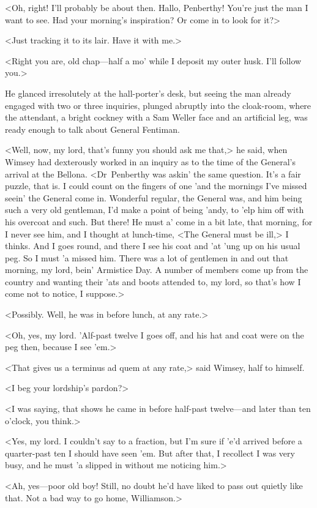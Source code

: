 <Oh, right! I'll probably be about then. Hallo, Penberthy! You're just the man I want to see. Had your morning's inspiration? Or come in to look for it?>

<Just tracking it to its lair. Have it with me.>

<Right you are, old chap—half a mo' while I deposit my outer husk. I'll follow you.>

He glanced irresolutely at the hall-porter's desk, but seeing the man already engaged with two or three inquiries, plunged abruptly into the cloak-room, where the attendant, a bright cockney with a Sam Weller face and an artificial leg, was ready enough to talk about General Fentiman.

<Well, now, my lord, that's funny you should ask me that,> he said, when Wimsey had dexterously worked in an inquiry as to the time of the General's arrival at the Bellona. <Dr~Penberthy was askin' the same question. It's a fair puzzle, that is. I could count on the fingers of one 'and the mornings I've missed seein' the General come in. Wonderful regular, the General was, and him being such a very old gentleman, I'd make a point of being 'andy, to 'elp him off with his overcoat and such. But there! He must a' come in a bit late, that morning, for I never see him, and I thought at lunch-time, <The General must be ill,> I thinks. And I goes round, and there I see his coat and 'at 'ung up on his usual peg. So I must 'a missed him. There was a lot of gentlemen in and out that morning, my lord, bein' Armistice Day. A number of members come up from the country and wanting their 'ats and boots attended to, my lord, so that's how I come not to notice, I suppose.>

<Possibly. Well, he was in before lunch, at any rate.>

<Oh, yes, my lord. 'Alf-past twelve I goes off, and his hat and coat were on the peg then, because I see 'em.>

<That gives us a terminus ad quem at any rate,> said Wimsey, half to himself.

<I beg your lordship's pardon?>

<I was saying, that shows he came in before half-past twelve—and later than ten o'clock, you think.>

<Yes, my lord. I couldn't say to a fraction, but I'm sure if 'e'd arrived before a quarter-past ten I should have seen 'em. But after that, I recollect I was very busy, and he must 'a slipped in without me noticing him.>

<Ah, yes—poor old boy! Still, no doubt he'd have liked to pass out quietly like that. Not a bad way to go home, Williamson.>

